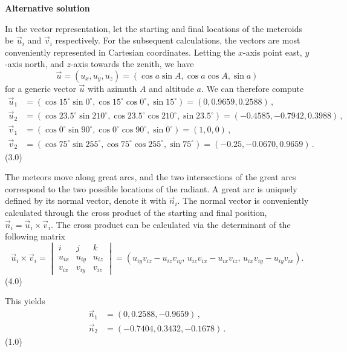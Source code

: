 \begin{description}
  \textbf{Alternative solution}

  In the vector representation, let the starting and final locations of the
  meteroids be $\vec{u}_i$ and $\vec{v}_i$ respectively. For the subsequent
  calculations, the vectors are most conveniently represented in Cartesian
  coordinates. Letting the $x$-axis point east, $y$-axis north, and $z$-axis
  towards the zenith, we have
  \[
    \vec{u} = (u_x, u_y, u_z) = (\cos a \sin A, \cos a \cos A, \sin a)
    \tag{1}
  \]
  for a generic vector $\vec{u}$ with azimuth $A$ and altitude $a$. We can
  therefore compute
  \begin{align*}
    \vec{u}_1 &= (\cos 15^\circ \sin 0^\circ,
                  \cos 15^\circ \cos 0^\circ,
                  \sin 15^\circ) = (0, 0.9659, 0.2588)\,,\\
    \vec{u}_2 &= (\cos 23.5^\circ \sin 210^\circ,
                  \cos 23.5^\circ \cos 210^\circ,
                  \sin 23.5^\circ) = (-0.4585, -0.7942, 0.3988)\,,\\
    \vec{v}_1 &= (\cos 0^\circ \sin 90^\circ,
                  \cos 0^\circ \cos 90^\circ,
                  \sin 0^\circ) = (1, 0, 0)\,,\\
    \vec{v}_2 &= (\cos 75^\circ \sin 255^\circ,
                  \cos 75^\circ \cos 255^\circ,
                  \sin 75^\circ) = (-0.25, -0.0670, 0.9659)\,.
  \end{align*}
  \hfill(3.0)

  The meteors move along great arcs, and the two intersections of the great
  arcs correspond to the two possible locations of the radiant. A great arc is
  uniquely defined by its normal vector, denote it with $\vec{n}_i$. The
  normal vector is conveniently calculated through the cross product of the
  starting and final position, $\vec{n}_i = \vec{u}_i \times \vec{v}_i$. The
  cross product can be calculated via the determinant of the following matrix
  \[
    \vec{u}_i \times \vec{v}_i =
    \begin{vmatrix}
      i & j & k\\
      u_{ix} & u_{iy} & u_{iz}\\
      v_{ix} & v_{iy} & v_{iz}
    \end{vmatrix}
    = (u_{iy}v_{iz} - u_{iz}v_{iy},\,
       u_{iz}v_{ix} - u_{ix}v_{iz},\,
       u_{ix}v_{iy} - u_{iy}v_{ix}).
  \]
  \hfill(4.0)

  This yields
  \begin{align*}
    \vec{n}_1 &= (0, 0.2588, -0.9659)\,,\\
    \vec{n}_2 &= (-0.7404, 0.3432, -0.1678)\,.
  \end{align*}
  \hfill(1.0)


\end{description}
